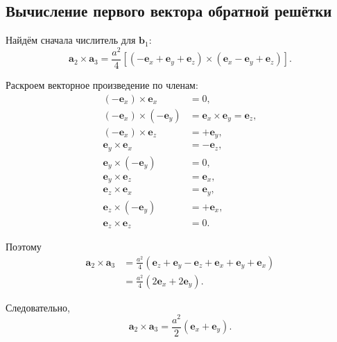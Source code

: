\documentclass[../final.tex]{subfiles}
\begin{document}

\subsection*{Вычисление первого вектора обратной решётки}

Найдём сначала числитель для $\mathbf b_1$:
%
\begin{equation*}
    \mathbf a_2\times\mathbf a_3
    =
    \frac{a^2}{4}
    \left[
        (-\mathbf e_x+\mathbf e_y+\mathbf e_z)
        \times
        (\mathbf e_x-\mathbf e_y+\mathbf e_z)
    \right].
\end{equation*}

Раскроем векторное произведение по членам:
%
\begin{align*}
    (-\mathbf e_x)\times\mathbf e_x
    &=
    0,
    \\
    (-\mathbf e_x)\times(-\mathbf e_y)
    &=
    \mathbf e_x\times\mathbf e_y
    =
    \mathbf e_z,
    \\
    (-\mathbf e_x)\times\mathbf e_z
    &=
    +\mathbf e_y,
    \\
    \mathbf e_y\times\mathbf e_x
    &=
    -\mathbf e_z,
    \\
    \mathbf e_y\times(-\mathbf e_y)
    &=
    0,
    \\
    \mathbf e_y\times\mathbf e_z
    &=
    \mathbf e_x,
    \\
    \mathbf e_z\times\mathbf e_x
    &=
    \mathbf e_y,
    \\
    \mathbf e_z\times(-\mathbf e_y)
    &=
    +\mathbf e_x,
    \\
    \mathbf e_z\times\mathbf e_z
    &=
    0.
\end{align*}

Поэтому
%
\begin{align*}
    \mathbf a_2\times\mathbf a_3
    &=
    \frac{a^2}{4}
    \left(
        \mathbf e_z
        +
        \mathbf e_y
        -
        \mathbf e_z
        +
        \mathbf e_x
        +
        \mathbf e_y
        +
        \mathbf e_x
    \right)
    \\
    &=
    \frac{a^2}{4}
    \left(
        2\mathbf e_x+2\mathbf e_y
    \right).
\end{align*}

Следовательно,
%
\begin{equation*}
    \boxed{
        \mathbf a_2\times\mathbf a_3
        =
        \frac{a^2}{2}
        \left(
            \mathbf e_x+\mathbf e_y
        \right)
    }.
\end{equation*}
\end{document}
